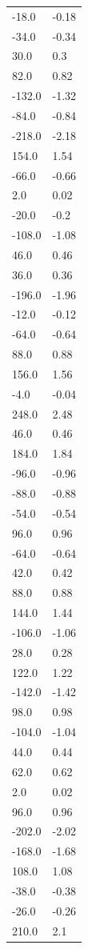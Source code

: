 \begin{longtable}{ll}
-18.0 & -0.18 \\
-34.0 & -0.34 \\
30.0 & 0.3 \\
82.0 & 0.82 \\
-132.0 & -1.32 \\
-84.0 & -0.84 \\
-218.0 & -2.18 \\
154.0 & 1.54 \\
-66.0 & -0.66 \\
2.0 & 0.02 \\
-20.0 & -0.2 \\
-108.0 & -1.08 \\
46.0 & 0.46 \\
36.0 & 0.36 \\
-196.0 & -1.96 \\
-12.0 & -0.12 \\
-64.0 & -0.64 \\
88.0 & 0.88 \\
156.0 & 1.56 \\
-4.0 & -0.04 \\
248.0 & 2.48 \\
46.0 & 0.46 \\
184.0 & 1.84 \\
-96.0 & -0.96 \\
-88.0 & -0.88 \\
-54.0 & -0.54 \\
96.0 & 0.96 \\
-64.0 & -0.64 \\
42.0 & 0.42 \\
88.0 & 0.88 \\
144.0 & 1.44 \\
-106.0 & -1.06 \\
28.0 & 0.28 \\
122.0 & 1.22 \\
-142.0 & -1.42 \\
98.0 & 0.98 \\
-104.0 & -1.04 \\
44.0 & 0.44 \\
62.0 & 0.62 \\
2.0 & 0.02 \\
96.0 & 0.96 \\
-202.0 & -2.02 \\
-168.0 & -1.68 \\
108.0 & 1.08 \\
-38.0 & -0.38 \\
-26.0 & -0.26 \\
210.0 & 2.1 \\

\end{longtable}

